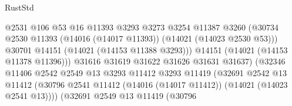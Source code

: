 \begin{lexlean}{RustStd}
\begin{coremodule}
                                              @2531
                                              @106
                                              @53
                                              @16
                                              @11393
                                              @3293
                                              @3273
                                              @3254
                                              @11387
                                              @3260
                                              (@30734
                                                @2530
                                                @11393
                                                (@14016 (@14017 @11393))
                                                (@14021 (@14023 @2530 @53)))
                                              @30701
                                              @14151
                                              (@14021 (@14153 @11388 @3293)))
                                            @14151
                                            (@14021 (@14153 @11378 @11396)))
                                          @31616
                                          @31619
                                          @31622
                                          @31626
                                          @31631
                                          @31637)
                                        (@32346
                                          @11406
                                          @2542
                                          @2549
                                          @13
                                          @3293
                                          @11412
                                          @3293
                                          @11419
                                          (@32691
                                            @2542
                                            @13
                                            @11412
                                            (@30796
                                              @2541
                                              @11412
                                              (@14016 (@14017 @11412))
                                              (@14021 (@14023 @2541 @13))))
                                          (@32691
                                            @2549
                                            @13
                                            @11419
                                            (@30796

\end{coremodule}
\end{lexlean}
